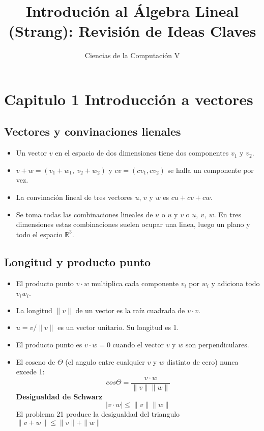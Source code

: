 \documentclass[]{article}
\title{Introduci\'on al \'Algebra Lineal (Strang): Revisi\'on de Ideas Claves}
\author{Ciencias de la Computaci\'on V}
\begin{document}
	
\maketitle

\section{Capitulo 1 Introducci\'on a vectores}

\subsection{Vectores y convinaciones lienales}

\begin{itemize}
	
	\item Un vector $ v $ en el espacio de dos dimensiones tiene dos componentes $ v_{1} $ y $ v_{2} $.  
	
	\item $ v+w=(v_{1}+w_{1},\ v_{2}+w_{2}) $ y $ cv=(cv_{1}, cv_{2}) $  se halla un componente por vez. 
	
	\item La convinación lineal de tres vectores $ u $, $ v $ y $ w $ es $ cu+cv+cw $.
	
	\item Se toma todas las combinaciones lineales de $ u $ o $ u $ y $ v $ o $ u,\ v,\ w $. En tres dimensiones estas combinaciones suelen ocupar una linea, luego un plano y todo el espacio $ \mathbb{R}^{3} $.  
	
\end{itemize}

\subsection{Longitud y producto punto}

\begin{itemize}
	
	\item El producto punto $ v\cdot w $ multiplica cada componente $ v_{i} $ por $ w_{i} $ y adiciona todo $ v_{i}w_{i} $. 
	
	\item La longitud $ \| v \| $ de un vector es la ra\'iz cuadrada de $ v\cdot v $. 
	
	\item $ u=v/ \| v \| $ es un vector unitario. Su longitud es 1. 
	
	\item El producto punto es $ v\cdot w = 0 $ cuando el vector $ v $ y $ w $ son perpendiculares. 
	
	\item El coseno de $ \Theta $ (el angulo entre cualquier $ v $ y $ w $ distinto de cero) nunca excede 1: 
	\[
	cos \Theta = \frac{v\cdot w}{\| v\| \|w \|} 
	\] 
	\textbf{Desigualdad de Schwarz}
	\[
	|v\cdot w|\leq \| v\| \|w \|
	\]
	El problema 21 produce la desigualdad del triangulo  $ \| v + w \| \leq \| v\| + \|w \| $
	
\end{itemize}
\end{document}
